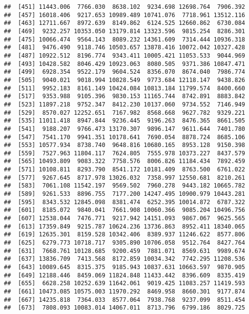 \documentclass[]{article}
\begin{document}
\begin{verbatim}
##  [451] 11443.006  7766.030  8638.102  9234.698 12698.764  7906.392
##  [457] 16018.406  9217.653 10989.489 10741.076  7718.961 13512.116
##  [463] 12711.667  8972.639  8149.862  6124.525 12660.862  6730.084
##  [469]  9232.257 10353.050 13179.814 13323.596  9815.254  8286.301
##  [475] 10066.474  9564.143  8089.232 14361.609  7314.444 10936.318
##  [481]  9476.490  9118.746 10503.657 13878.416 10072.042 10327.428
##  [487] 10922.512  8196.774  9343.411 10005.421 11053.533  9044.969
##  [493] 10428.582  8046.429 10923.063  8080.505  9371.386 10847.471
##  [499]  6928.354  9522.179  9604.524  8356.070  8674.040  7986.774
##  [505]  9040.021  9018.994 10828.549  9773.684 12118.147  9438.826
##  [511]  9952.183  8161.149 10424.084 10813.184 11799.574  8400.660
##  [517]  9353.988  9105.396  9830.153 11165.744  8742.891  8883.842
##  [523] 11897.218  9752.347  8412.230 10137.060  9734.552  7146.949
##  [529]  8570.027 12252.651  7167.982  8568.668  9627.782  9329.221
##  [535] 11011.418  8947.844  9236.445  9196.263  8476.365  8661.505
##  [541]  9188.207  9766.473 13170.307  9896.147  9611.644  7401.780
##  [547]  7541.170  9941.351 10178.641  7690.054  8878.724  8685.106
##  [553] 10577.934  8738.740  9648.816 10680.165  8953.128  9150.398
##  [559]  7527.963 11804.117  7624.805  7555.978 10373.227  8437.579
##  [565] 10493.809  9083.322  7758.576  8006.826 11184.434  7892.459
##  [571] 10108.811  8293.790  8541.172 10181.409  8763.500  6761.022
##  [577]  9267.645  8717.978 13026.032  7358.997 12550.681  8210.261
##  [583]  7061.108 11542.197  9569.502  7960.278  9443.182 10665.782
##  [589]  9261.533  8896.755  7177.200 14247.495 10900.979 10443.281
##  [595]  8343.532 12845.098  8381.474  6252.395 10014.872  6787.322
##  [601]  8185.072  9840.041  7661.908 10060.366  9085.204 10496.756
##  [607] 12538.044  7476.771  9217.942 14151.093  9867.067  9625.565
##  [613] 17359.849  9215.787 10624.236 13736.863  8952.411 18340.065
##  [619] 12635.301  8159.528 10342.406  8389.937 11246.622  8577.806
##  [625]  6279.773 10718.717  9305.890 10706.058  9512.764  8427.764
##  [631]  7668.761 10128.685  9200.459  7881.071  8569.631  9989.674
##  [637] 13836.709  7413.568  8172.859 10034.342  7742.295 11208.536
##  [643] 10089.645  8315.375  9185.943 10837.631 10663.597  9870.905
##  [649] 12188.446  8459.069 11824.848 11433.442  8396.609  8335.419
##  [655]  6628.258 10252.639 11642.061  9019.425 11083.257 11419.593
##  [661] 10473.085 10575.003 11970.292  8469.958  8660.301  9177.874
##  [667] 14235.818  7364.033  8577.064  7938.768  9237.099  8511.454
##  [673]  7808.093 10083.014 14067.011  8713.796  6799.186  8029.725

\end{verbatim}
\end{document}
